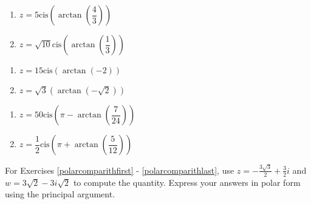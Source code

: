 \documentclass{ximera}
\begin{document}
\begin{multicols}{2} 

\begin{enumerate}

\setcounter{enumi}{\value{HW}}

\item $z = 5\text{cis}\left(\arctan\left(\dfrac{4}{3}\right)\right)$
\item $z = \sqrt{10}\text{cis}\left(\arctan\left(\dfrac{1}{3}\right)\right)$ 

\setcounter{HW}{\value{enumi}}

\end{enumerate}

\end{multicols}

\begin{multicols}{2} 

\begin{enumerate}

\setcounter{enumi}{\value{HW}}

\item $z = 15\text{cis}\left(\arctan\left(-2\right)\right)$ 
\item $z=  \sqrt{3}\left(\arctan\left(-\sqrt{2}\right)\right)$

\setcounter{HW}{\value{enumi}}

\end{enumerate}

\end{multicols}

\begin{multicols}{2} 

\begin{enumerate}

\setcounter{enumi}{\value{HW}}

\item $z = 50\text{cis}\left(\pi-\arctan\left(\dfrac{7}{24}\right)\right)$ 
\item  $z = \dfrac{1}{2}\text{cis}\left(\pi+\arctan\left(\dfrac{5}{12}\right)\right)$ \label{rectcomplast}

\setcounter{HW}{\value{enumi}}

\end{enumerate}

\end{multicols}

For Exercises \ref{polarcomparithfirst} - \ref{polarcomparithlast}, use $z = -\frac{3\sqrt{3}}{2} + \frac{3}{2}i$ and $w = 3\sqrt{2} - 3i\sqrt{2}$ to compute the quantity.  Express your answers in polar form using the principal argument.
\end{document}
